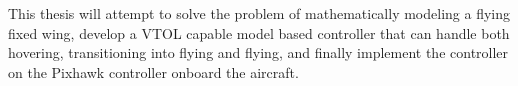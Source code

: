 This thesis will attempt to solve the problem of mathematically modeling a flying fixed wing, develop a VTOL capable model based controller that can handle both hovering, transitioning into flying and flying, and finally implement the controller on the Pixhawk controller onboard the aircraft.